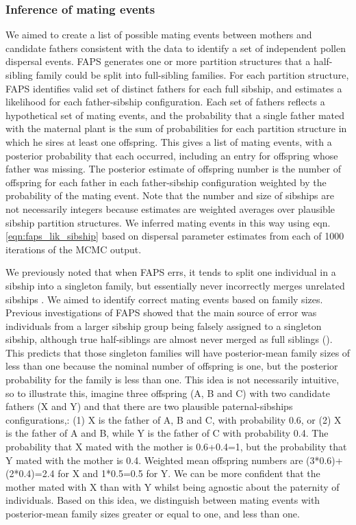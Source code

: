 \documentclass[10pt, a4paper, twocolumn]{article} %
\begin{document}
\subsubsection{Inference of mating events}

We aimed to create a list of possible mating events between mothers and candidate fathers consistent with the data to identify a set of independent pollen dispersal events.
FAPS generates one or more partition structures that a half-sibling family could be split into full-sibling families.
For each partition structure, FAPS identifies valid set of distinct fathers for each full sibship, and estimates a likelihood for each father-sibship configuration.
Each set of fathers reflects a hypothetical set of mating events, and the probability that a single father mated with the maternal plant is the sum of probabilities for each partition structure in which he sires at least one offspring.
This gives a list of mating events, with a posterior probability that each occurred, including an entry for offspring whose father was missing.
The posterior estimate of offspring number is the number of offspring for each father in each father-sibship configuration weighted by the probability of the mating event.
Note that the number and size of sibships are not necessarily integers because estimates are weighted averages over plausible sibship partition structures.
We inferred mating events in this way using eqn. \ref{eqn:faps_lik_sibship} based on dispersal parameter estimates from each of 1000 iterations of the MCMC output.

We previously noted that when FAPS errs, it tends to split one individual in a sibship into a singleton family, but essentially never incorrectly merges unrelated sibships \cite{ellis2018efficient}.
We aimed to identify correct mating events based on family sizes.
Previous investigations of FAPS showed that the main source of error was individuals from a larger sibship group being falsely assigned to a singleton sibship, although true half-siblings are almost never merged as full siblings (\cite{ellis2018efficient}).
This predicts that those singleton families will have posterior-mean family sizes of less than one because the nominal number of offspring is one, but the posterior probability for the family is less than one.
This idea is not necessarily intuitive, so to illustrate this, imagine three offspring (A, B and C) with two candidate fathers (X and Y) and that there are two plausible paternal-sibships configurations,: (1) X is the father of A, B and C, with probability 0.6, or (2) X is the father of A and B, while Y is the father of C with probability 0.4.
The probability that X mated with the mother is 0.6+0.4=1, but the probability that Y mated with the mother is 0.4.
Weighted mean offspring numbers are (3*0.6)+(2*0.4)=2.4 for X and 1*0.5=0.5 for Y.
We can be more confident that the mother mated with X than with Y whilst being agnostic about the paternity of individuals.
Based on this idea, we distinguish between mating events with posterior-mean family sizes greater or equal to one, and less than one.
\end{document}
